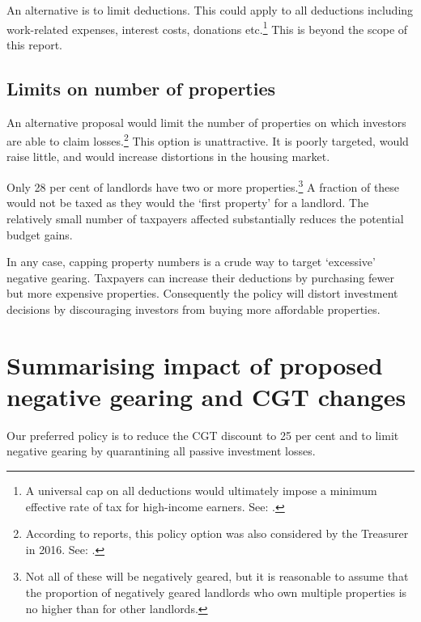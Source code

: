 \documentclass{grattanAlpha}\usepackage[]{graphicx}\usepackage[]{color}
\begin{document}
An alternative is to limit deductions. This could apply to all deductions including work-related expenses, interest costs, donations etc.\footnote{A universal cap on all deductions would ultimately impose a minimum effective rate of tax for high-income earners. See: \textcite[][61]{BCA2016}.}  This is beyond the scope of this report. 

\subsection{Limits on number of properties}
An alternative proposal would limit the number of properties on which investors are able to claim losses.\footnote{According to reports, this policy option was also considered by the Treasurer in 2016. See: \textcite{Coorey2016}.}  This option is unattractive. It is poorly targeted, would raise little, and would increase distortions in the housing market.

Only 28 per cent of landlords have two or more properties.\footnote{\textcites{ABS2015g}{HILDA2015} Not all of these will be negatively geared, but it is reasonable to assume that the proportion of negatively geared landlords who own multiple properties is no higher than for other landlords.} A fraction of these would not be taxed as they would the ‘first property’ for a landlord. The relatively small number of taxpayers affected substantially reduces the potential budget gains. 

In any case, capping property numbers is a crude way to target ‘excessive’ negative gearing. Taxpayers can increase their deductions by purchasing fewer but more expensive properties. Consequently the policy will distort investment decisions by discouraging investors from buying more affordable properties. 

\section{Summarising impact of proposed negative gearing and CGT changes}\label{sec:Summarizing-impact-proposed-NG-and-CGT}
Our preferred policy is to reduce the CGT discount to 25 per cent and to limit negative gearing by quarantining all passive investment losses.
\end{document}

